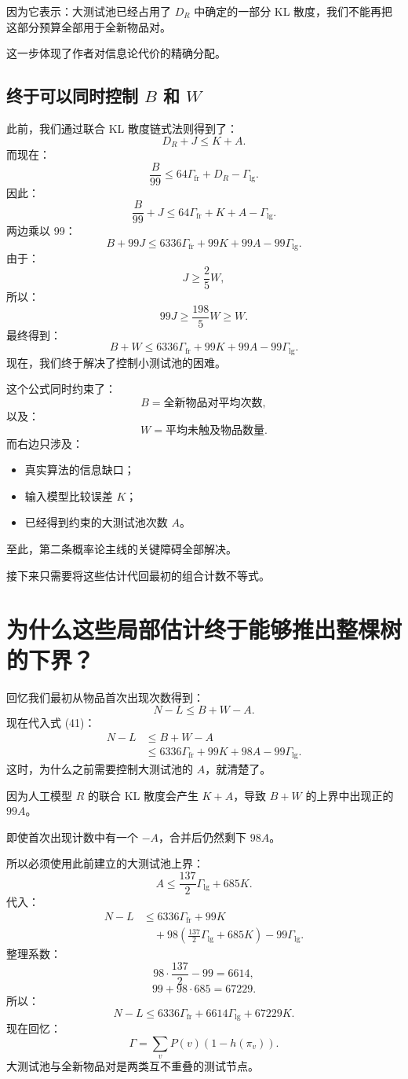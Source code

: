 \documentclass[UTF8,11pt]{ctexart}
\begin{document}
因为它表示：大测试池已经占用了 $D_R$ 中确定的一部分 KL 散度，我们不能再把这部分预算全部用于全新物品对。

这一步体现了作者对信息论代价的精确分配。

\subsection{终于可以同时控制 $B$ 和 $W$}
此前，我们通过联合 KL 散度链式法则得到了：
\[D_R+J\le K+A.\]
而现在：
\[\frac B{99}\le64\Gamma_{\mathrm{fr}}+D_R-\Gamma_{\mathrm{lg}}.\]
因此：
\[\frac B{99}+J\le64\Gamma_{\mathrm{fr}}+K+A-\Gamma_{\mathrm{lg}}.\]
两边乘以 99：
\[B+99J\le6336\Gamma_{\mathrm{fr}}+99K+99A-99\Gamma_{\mathrm{lg}}.\]
由于：
\[J\ge\frac25W,\]
所以：
\[99J\ge\frac{198}{5}W\ge W.\]
最终得到：
\begin{equation}\boxed{B+W\le6336\Gamma_{\mathrm{fr}}+99K+99A-99\Gamma_{\mathrm{lg}}.}\tag{41}\end{equation}
现在，我们终于解决了控制小测试池的困难。

这个公式同时约束了：
\[B=\text{全新物品对平均次数},\]
以及：
\[W=\text{平均未触及物品数量}.\]
而右边只涉及：
\begin{itemize}
\item 真实算法的信息缺口；
\item 输入模型比较误差 $K$；
\item 已经得到约束的大测试池次数 $A$。
\end{itemize}
至此，第二条概率论主线的关键障碍全部解决。

接下来只需要将这些估计代回最初的组合计数不等式。

\section{为什么这些局部估计终于能够推出整棵树的下界？}
回忆我们最初从物品首次出现次数得到：
\[N-L\le B+W-A.\]
现在代入式 (41)：
\[
\begin{aligned}
N-L&\le B+W-A\\
&\le6336\Gamma_{\mathrm{fr}}+99K+98A-99\Gamma_{\mathrm{lg}}.
\end{aligned}
\]
这时，为什么之前需要控制大测试池的 $A$，就清楚了。

因为人工模型 $R$ 的联合 KL 散度会产生 $K+A$，导致 $B+W$ 的上界中出现正的 $99A$。

即使首次出现计数中有一个 $-A$，合并后仍然剩下 $98A$。

所以必须使用此前建立的大测试池上界：
\[A\le\frac{137}{2}\Gamma_{\mathrm{lg}}+685K.\]
代入：
\[
\begin{aligned}
N-L&\le6336\Gamma_{\mathrm{fr}}+99K\\
&\quad+98\left(\frac{137}{2}\Gamma_{\mathrm{lg}}+685K\right)-99\Gamma_{\mathrm{lg}}.
\end{aligned}
\]
整理系数：
\[98\cdot\frac{137}{2}-99=6614,\]
\[99+98\cdot685=67229.\]
所以：
\begin{equation}\boxed{N-L\le6336\Gamma_{\mathrm{fr}}+6614\Gamma_{\mathrm{lg}}+67229K.}\tag{42}\end{equation}
现在回忆：
\[\Gamma=\sum_vP(v)(1-h(\pi_v)).\]
大测试池与全新物品对是两类互不重叠的测试节点。
\end{document}

